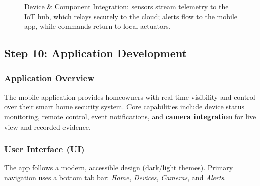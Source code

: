 \documentclass[conference]{IEEEtran}
\begin{document}
\begin{figure}[h]
{%
  }
  \caption{Device \& Component Integration: sensors stream telemetry to the IoT hub, which relays securely to the cloud; alerts flow to the mobile app, while commands return to local actuators.}
  \label{fig:device_integration_tikz}

\end{figure}


\subsection{Step 10: Application Development}

\subsubsection{Application Overview}
The mobile application provides homeowners with real-time visibility and control over their smart home security system. Core capabilities include device status monitoring, remote control, event notifications, and \textbf{camera integration} for live view and recorded evidence.

\subsubsection{User Interface (UI)}
The app follows a modern, accessible design (dark/light themes). Primary navigation uses a bottom tab bar: \emph{Home}, \emph{Devices}, \emph{Cameras}, and \emph{Alerts}.
\end{document}
